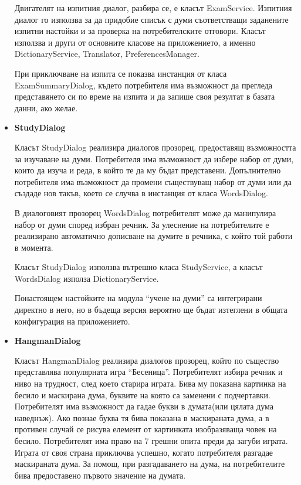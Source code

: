 \begin{itemize}
      Двигателят на изпитния диалог, разбира се, е класът
      ExamService. Изпитния диалог го използва за да придобие списък с
      думи съответстващи заданените изпитни настойки и за проверка на
      потребителските отговори. Класът използва и други от основните
      класове на приложението, а именно DictionaryService, Translator,
      PreferencesManager. 

      При приключване на изпита се показва инстанция от класа
      ExamSummaryDialog, където потребителя има възможност да прегледа
      представянето си по време на изпита и да запише своя резултат в
      базата данни, ако желае.
    \item \textbf{StudyDialog}

      Класът StudyDialog реализира диалогов прозорец, предоставящ
      възможността за изучаване на думи. Потребителя има възможност да
      избере набор от думи, които да изуча и реда, в който те да му
      бъдат представени. Допълнително потребителя има възможност да
      промени съществуващ набор от думи или да създаде нов такъв,
      което се случва в инстанция от класа WordsDialog. 

      В диалоговият прозорец WordsDialog потребителят може да
      манипулира набор от думи според избран речник. За улеснение на
      потребителите е реализирано автоматично дописване на думите в
      речника, с който той работи в момента.

      Класът StudyDialog използва вътрешно класа StudyService, а
      класът WordsDialog използа DictionaryService.

      Понастоящем настойките на модула "`учене на думи"' са
      интегрирани директно в него, но в бъдеща версия вероятно ще
      бъдат изтеглени в общата конфигурация на приложението.

    \item \textbf{HangmanDialog}

      Класът HangmanDialog реализира диалогов прозорец, който по
      същество представлява популярната игра
      "`Бесеница"'. Потребителят избира речник и ниво на трудност,
      след което старира играта. Бива му показана картинка на бесило и
      маскирана дума, буквите на която са заменени с
      подчертавки. Потребителят има възможност да гадае букви в
      думата(или цялата дума наведнъж). Ако познае буква тя бива
      показана в маскираната дума, а в противен случай се рисува
      елемент от картинката изобразяваща човек на бесило. Потребителят
      има право на 7 грешни опита преди да загуби играта. Играта от
      своя страна приключва успешно, когато потребителя разгадае
      маскираната дума. За помощ, при разгадаването на дума, на
      потребителите бива предоставено първото значение на думата.


\end{itemize}
